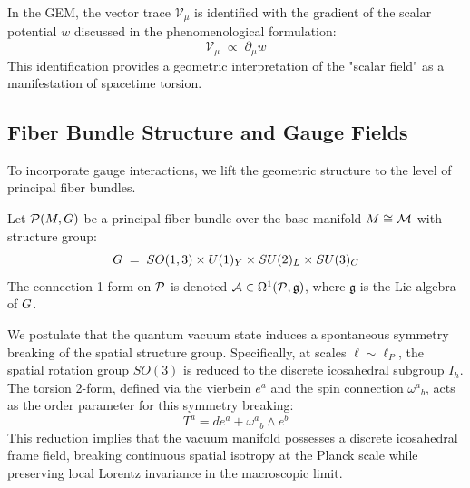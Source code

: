 \begin{remark}
In the GEM, the vector trace $\mathcal{V}_\mu$ is identified with the gradient of the scalar potential $w$ discussed in the phenomenological formulation:
\begin{equation}
    \mathcal{V}_\mu \;\propto\; \partial_\mu w
\end{equation}
This identification provides a geometric interpretation of the "scalar field" as a manifestation of spacetime torsion.
\end{remark}

\subsection{Fiber Bundle Structure and Gauge Fields}

To incorporate gauge interactions, we lift the geometric structure to the level of principal fiber bundles.

\begin{definition}
Let $\mathcal{P}(M, G)$ be a principal fiber bundle over the base manifold $M \cong \mathcal{M}$ with structure group:
\begin{equation}
    G \;=\; SO(1,3) \times U(1)_Y \times SU(2)_L \times SU(3)_C
\end{equation}
The connection 1-form on $\mathcal{P}$ is denoted $\mathcal{A} \in \Omega^1(\mathcal{P}, \mathfrak{g})$, where $\mathfrak{g}$ is the Lie algebra of $G$.
\end{definition}

\begin{postulate}
\label{post:bundle}
We postulate that the quantum vacuum state induces a spontaneous symmetry breaking of the spatial structure group. Specifically, at scales $\ell \sim \ell_P$, the spatial rotation group $SO(3)$ is reduced to the discrete icosahedral subgroup $I_h$. 
The torsion 2-form, defined via the vierbein $e^a$ and the spin connection $\omega^a{}_b$, acts as the order parameter for this symmetry breaking:
\begin{equation}
    T^a = d e^a + \omega^a{}_b \wedge e^b
\end{equation}
This reduction implies that the vacuum manifold possesses a discrete icosahedral frame field, breaking continuous spatial isotropy at the Planck scale while preserving local Lorentz invariance in the macroscopic limit.
\end{postulate}

